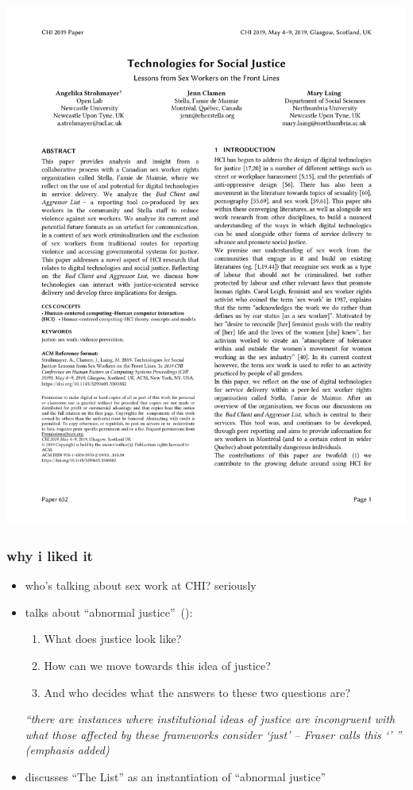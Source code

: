 \documentclass[aspectratio=169,10pt]{beamer} %
\begin{document}
\begin{frame}[t] %
\includegraphics[width=\textwidth]{pdfs/technologies_for_social_justice.pdf}
\end{frame}

\begin{frame}\frametitle{why i liked it}
    \begin{itemize}
      \item who's talking about sex work at CHI? seriously
      \item talks about ``abnormal justice''~(\cite{doi:10.1086/589478}):
      \begin{enumerate}
        \item What does justice look like?
        \item How can we move towards this idea of justice?
        \item And who decides what the answers to these two questions are?
      \end{enumerate}
      {\itshape
      \vspace{1em}
      ``there are instances where institutional ideas of justice are incongruent with what those affected by these frameworks consider `just' – Fraser calls this  `' '' (emphasis added)
      \vspace{1em}
      }
      \item discusses ``The List'' as an instantiation of ``abnormal justice''
    \end{itemize}
\end{frame}
\end{document}
